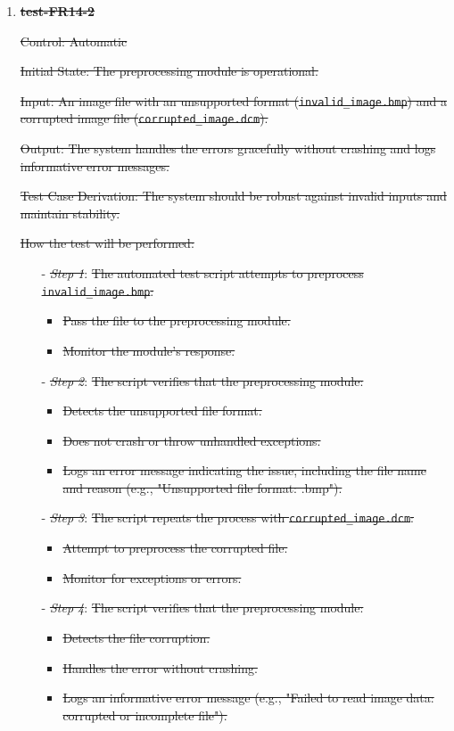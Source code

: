 \documentclass[12pt, titlepage]{article}
\begin{document}
\begin{enumerate}
\item \textbf{\sout{test-FR14-2}} \label{test-FR14-2}

\sout{Control: Automatic}

\sout{Initial State: The preprocessing module is operational.}

\sout{Input: An image file with an unsupported format (\texttt{invalid\_image.bmp}) and a corrupted image file (\texttt{corrupted\_image.dcm}).}

\sout{Output: The system handles the errors gracefully without crashing and logs informative error messages.}

\sout{Test Case Derivation: The system should be robust against invalid inputs and maintain stability.}

\sout{How the test will be performed:}

\begin{itemize}
  \item[-] \textit{\sout{Step 1}}: \sout{The automated test script attempts to preprocess \texttt{invalid\_image.bmp}:}
    \begin{itemize}
      \item \sout{Pass the file to the preprocessing module.}
      \item \sout{Monitor the module's response.}
    \end{itemize}
  \item[-] \textit{\sout{Step 2}}: \sout{The script verifies that the preprocessing module:}
    \begin{itemize}
      \item \sout{Detects the unsupported file format.}
      \item \sout{Does not crash or throw unhandled exceptions.}
      \item \sout{Logs an error message indicating the issue, including the file name and reason (e.g., "Unsupported file format: .bmp").}
    \end{itemize}
  \item[-] \textit{\sout{Step 3}}: \sout{The script repeats the process with \texttt{corrupted\_image.dcm}:}
    \begin{itemize}
      \item \sout{Attempt to preprocess the corrupted file.}
      \item \sout{Monitor for exceptions or errors.}
    \end{itemize}
  \item[-] \textit{\sout{Step 4}}: \sout{The script verifies that the preprocessing module:}
    \begin{itemize}
      \item \sout{Detects the file corruption.}
      \item \sout{Handles the error without crashing.}
      \item \sout{Logs an informative error message (e.g., "Failed to read image data: corrupted or incomplete file").}
    \end{itemize}
\end{itemize}


\end{enumerate}
\end{document}
